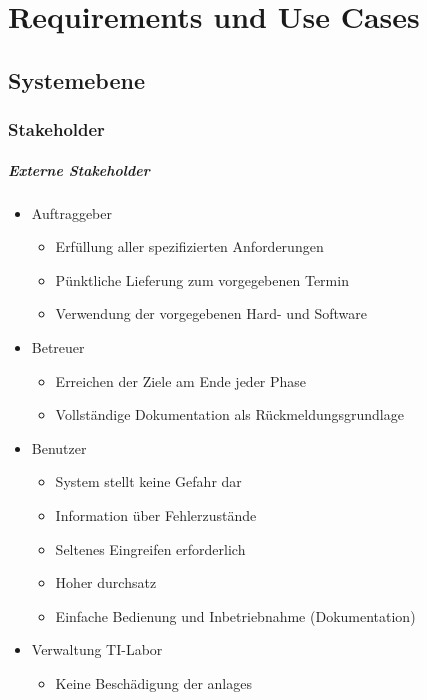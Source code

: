 \chapter{Requirements und Use Cases}\label{ch:requirements-und-use-cases}

\section{Systemebene}\label{sec:systemebene}


\subsection{Stakeholder}\label{subsec:stakeholder}


\paragraph{Externe Stakeholder}
\begin{itemize}
    \item Auftraggeber
    \begin{itemize}
        \item Erfüllung aller spezifizierten Anforderungen
        \item Pünktliche Lieferung zum vorgegebenen Termin
        \item Verwendung der vorgegebenen Hard- und Software
    \end{itemize}
    \item Betreuer
    \begin{itemize}
        \item Erreichen der Ziele am Ende jeder Phase
        \item Vollständige Dokumentation als Rückmeldungsgrundlage
    \end{itemize}
    \item Benutzer
    \begin{itemize}
        \item System stellt keine Gefahr dar
        \item Information über Fehlerzustände
        \item Seltenes Eingreifen erforderlich
        \item Hoher \gls{durchsatz}
        \item Einfache Bedienung und Inbetriebnahme (Dokumentation)
    \end{itemize}
    \item Verwaltung TI-Labor
    \begin{itemize}
        \item Keine Beschädigung der \glspl{anlage}
    \end{itemize}
\end{itemize}


